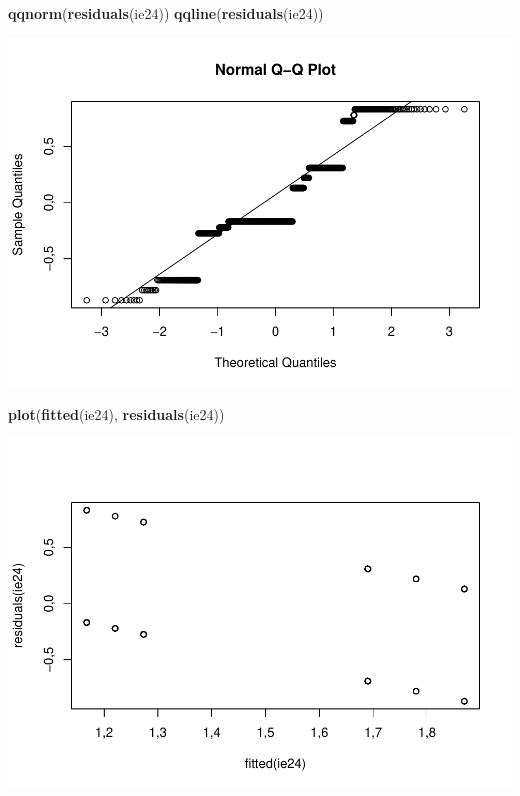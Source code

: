 \documentclass[]{article}
\newenvironment{Shaded}{\begin{snugshade}}{\end{snugshade}}
\newcommand{\KeywordTok}[1]{\textcolor[rgb]{0.13,0.29,0.53}{\textbf{#1}}}
\newcommand{\NormalTok}[1]{#1}
\begin{document}
\begin{Shaded}
\begin{Highlighting}[]
\KeywordTok{qqnorm}\NormalTok{(}\KeywordTok{residuals}\NormalTok{(ie24))}
\KeywordTok{qqline}\NormalTok{(}\KeywordTok{residuals}\NormalTok{(ie24))}
\end{Highlighting}
\end{Shaded}

\includegraphics{titanicDataClean_files/figure-latex/unnamed-chunk-25-17.pdf}

\begin{Shaded}
\begin{Highlighting}[]
\KeywordTok{plot}\NormalTok{(}\KeywordTok{fitted}\NormalTok{(ie24), }\KeywordTok{residuals}\NormalTok{(ie24))}
\end{Highlighting}
\end{Shaded}

\includegraphics{titanicDataClean_files/figure-latex/unnamed-chunk-25-18.pdf}
\end{document}
